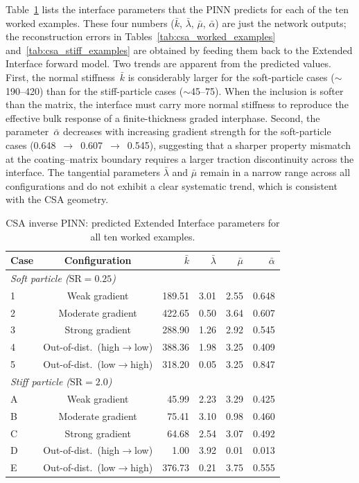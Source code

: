 \documentclass[oneside, 12pt, a4paper, bibliography=totoc]{book}
\begin{document}
Table~\ref{tab:csa_interface_params} lists the interface parameters that the PINN predicts for each of the ten worked examples. These four numbers ($\bar{k}$, $\bar{\lambda}$, $\bar{\mu}$, $\bar{\alpha}$) are just the network outputs; the reconstruction errors in Tables~\ref{tab:csa_worked_examples} and~\ref{tab:csa_stiff_examples} are obtained by feeding them back to the Extended Interface forward model. Two trends are apparent from the predicted values. First, the normal stiffness~$\bar{k}$ is considerably larger for the soft-particle cases ($\sim$190--420) than for the stiff-particle cases ($\sim$45--75). When the inclusion is softer than the matrix, the interface must carry more normal stiffness to reproduce the effective bulk response of a finite-thickness graded interphase. Second, the parameter~$\bar{\alpha}$ decreases with increasing gradient strength for the soft-particle cases (0.648~$\to$~0.607~$\to$~0.545), suggesting that a sharper property mismatch at the coating--matrix boundary requires a larger traction discontinuity across the interface. The tangential parameters $\bar{\lambda}$ and $\bar{\mu}$ remain in a narrow range across all configurations and do not exhibit a clear systematic trend, which is consistent with the CSA geometry.

\begin{table}[htbp]
\centering
\caption{CSA inverse PINN: predicted Extended Interface parameters for all ten worked examples.}
\label{tab:csa_interface_params}
{\footnotesize
\begin{tabular}{l c r r r r}
\toprule
Case & Configuration & $\bar{k}$ & $\bar{\lambda}$ & $\bar{\mu}$ & $\bar{\alpha}$ \\
\midrule
\multicolumn{6}{l}{\textit{Soft particle ($\text{SR} = 0.25$)}} \\
1 & Weak gradient     & 189.51 & 3.01 & 2.55 & 0.648 \\
2 & Moderate gradient  & 422.65 & 0.50 & 3.64 & 0.607 \\
3 & Strong gradient    & 288.90 & 1.26 & 2.92 & 0.545 \\
4 & Out-of-dist.\ (high$\to$low) & 388.36 & 1.98 & 3.25 & 0.409 \\
5 & Out-of-dist.\ (low$\to$high) & 318.20 & 0.05 & 3.25 & 0.847 \\
\midrule
\multicolumn{6}{l}{\textit{Stiff particle ($\text{SR} = 2.0$)}} \\
A & Weak gradient     & 45.99 & 2.23 & 3.29 & 0.425 \\
B & Moderate gradient  & 75.41 & 3.10 & 0.98 & 0.460 \\
C & Strong gradient    & 64.68 & 2.54 & 3.07 & 0.492 \\
D & Out-of-dist.\ (high$\to$low) & 1.00 & 3.92 & 0.01 & 0.013 \\
E & Out-of-dist.\ (low$\to$high) & 376.73 & 0.21 & 3.75 & 0.555 \\
\bottomrule
\end{tabular}
}
\end{table}
\end{document}
